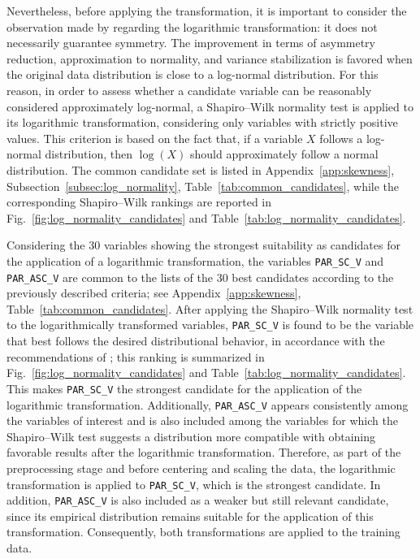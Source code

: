 Nevertheless, before applying the transformation, it is important to consider the observation made by \cite{feng2014log} regarding the logarithmic transformation: it does not necessarily guarantee symmetry. The improvement in terms of asymmetry reduction, approximation to normality, and variance stabilization is favored when the original data distribution is close to a log-normal distribution. For this reason, in order to assess whether a candidate variable can be reasonably considered approximately log-normal, a Shapiro--Wilk normality test is applied to its logarithmic transformation, considering only variables with strictly positive values. This criterion is based on the fact that, if a variable \(X\) follows a log-normal distribution, then \(\log(X)\) should approximately follow a normal distribution. The common candidate set is listed in Appendix~\ref{app:skewness}, Subsection~\ref{subsec:log_normality}, Table~\ref{tab:common_candidates}, while the corresponding Shapiro--Wilk rankings are reported in Fig.~\ref{fig:log_normality_candidates} and Table~\ref{tab:log_normality_candidates}.

Considering the 30 variables showing the strongest suitability as candidates for the application of a logarithmic transformation, the variables \texttt{PAR\_SC\_V} and \texttt{PAR\_ASC\_V} are common to the lists of the 30 best candidates according to the previously described criteria; see Appendix~\ref{app:skewness}, Table~\ref{tab:common_candidates}. After applying the Shapiro--Wilk normality test to the logarithmically transformed variables, \texttt{PAR\_SC\_V} is found to be the variable that best follows the desired distributional behavior, in accordance with the recommendations of \cite{feng2014log}; this ranking is summarized in Fig.~\ref{fig:log_normality_candidates} and Table~\ref{tab:log_normality_candidates}. This makes \texttt{PAR\_SC\_V} the strongest candidate for the application of the logarithmic transformation. Additionally, \texttt{PAR\_ASC\_V} appears consistently among the variables of interest and is also included among the variables for which the Shapiro--Wilk test suggests a distribution more compatible with obtaining favorable results after the logarithmic transformation. Therefore, as part of the preprocessing stage and before centering and scaling the data, the logarithmic transformation is applied to \texttt{PAR\_SC\_V}, which is the strongest candidate. In addition, \texttt{PAR\_ASC\_V} is also included as a weaker but still relevant candidate, since its empirical distribution remains suitable for the application of this transformation. Consequently, both transformations are applied to the training data.


